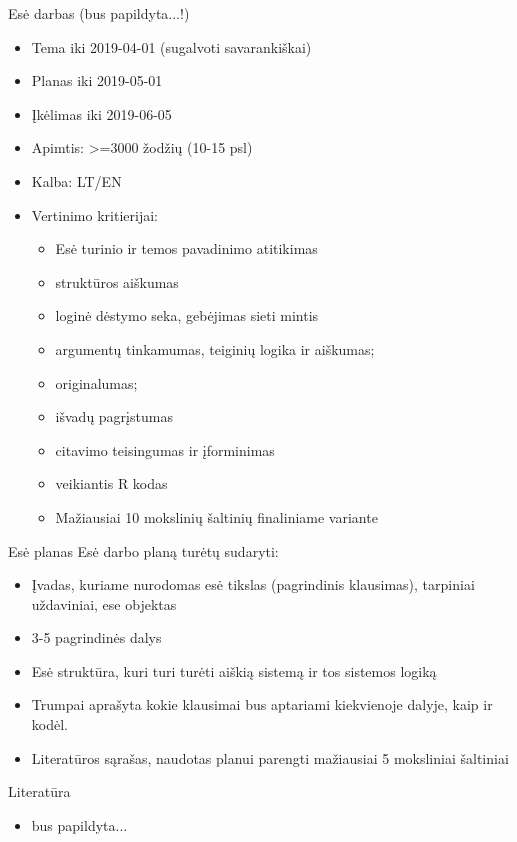 \documentclass[11pt,xcolor=table]{beamer}
\begin{document}
\begin{frame}{Esė darbas (bus papildyta...!) }
\begin{itemize}
\item Tema iki 2019-04-01 (sugalvoti savarankiškai)
\item Planas iki 2019-05-01
\item Įkėlimas iki 2019-06-05
\item Apimtis: >=3000 žodžių (10-15 psl)
\item Kalba: LT/EN
\item Vertinimo kritierijai:
\begin{itemize}
\item Esė turinio ir temos pavadinimo atitikimas
\item struktūros aiškumas
\item loginė dėstymo seka, gebėjimas sieti mintis
\item argumentų tinkamumas, teiginių logika ir aiškumas;
\item originalumas;
\item išvadų pagrįstumas
\item citavimo teisingumas ir įforminimas
\item veikiantis R kodas
\item Mažiausiai 10 mokslinių šaltinių finaliniame variante
\end{itemize}
\end{itemize}
\end{frame}

\begin{frame}{Esė planas}
Esė darbo planą turėtų sudaryti:
\begin{itemize}
\item Įvadas, kuriame nurodomas esė tikslas (pagrindinis klausimas), tarpiniai uždaviniai, ese objektas
\item 3-5 pagrindinės dalys
\item Esė struktūra, kuri turi turėti aiškią sistemą ir tos sistemos logiką
\item Trumpai aprašyta kokie klausimai bus aptariami kiekvienoje dalyje, kaip ir kodėl.
\item Literatūros sąrašas, naudotas planui parengti mažiausiai 5 moksliniai šaltiniai
\end{itemize}
\end{frame}


\begin{frame}{Literatūra}
\begin{itemize}
\item bus papildyta...
\end{itemize}
\end{frame}
\end{document}
